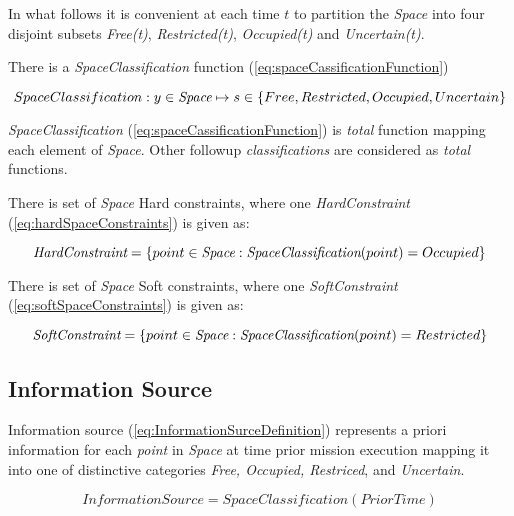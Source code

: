     \noindent In what follows it is convenient at each time $t$ to partition the \emph{Space} into four disjoint subsets \emph{Free(t)}, \emph{Restricted(t)}, \emph{Occupied(t)} and \emph{Uncertain(t)}.

    There is a \emph{SpaceClassification}  function (\ref{eq:spaceCassificationFunction})
    
    \begin{equation}\label{eq:spaceCassificationFunction}
        SpaceClassification: y \in \emph{Space} \mapsto s \in \{Free, Restricted, Occupied, Uncertain \}
    \end{equation}

    \begin{note}
        \emph{SpaceClassification} (\ref{eq:spaceCassificationFunction}) is \emph{total} function mapping each element of \emph{Space}. Other followup \emph{classifications} are considered as \emph{total} functions. 
    \end{note}

    There is set of \emph{Space} Hard constraints, where one \emph{HardConstraint} (\ref{eq:hardSpaceConstraints}) is given as:

    \begin{equation}\label{eq:hardSpaceConstraints}
        \emph{HardConstraint} = \{point \in \emph{Space}: \emph{SpaceClassification}(point) = Occupied \}
    \end{equation}

    There is set of \emph{Space} Soft constraints, where one \emph{SoftConstraint} (\ref{eq:softSpaceConstraints}) is given as:

    \begin{equation}\label{eq:softSpaceConstraints}
        \emph{SoftConstraint} = \{point \in \emph{Space}: \emph{SpaceClassification}(point) = Restricted \}
    \end{equation}

\subsection{Information Source}\label{s:informationSources}
    \begin{definition}{Information source} \label{def:InformationSurceDefinition}         
        (\ref{eq:InformationSurceDefinition}) represents a priori information for each \emph{point} in \emph{Space} at time prior mission execution mapping it into one of distinctive categories \emph{Free, Occupied, Restriced}, and \emph{Uncertain}.
        
        \begin{equation}\label{eq:InformationSurceDefinition}
            InformationSource = SpaceClassification(PriorTime)
        \end{equation}
    \end{definition}


